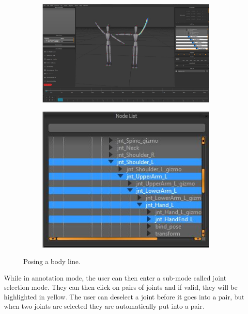 \begin{figure}[h!]
	\centering
        \begin{subfigure}[b!]{0.45\textwidth}
        	\centering
                \includegraphics[width=\linewidth]{img/ui3}
        \end{subfigure}
        \quad
        \begin{subfigure}[b!]{0.45\textwidth}
        	\centering
                \includegraphics[width=\linewidth]{img/ui4}
        \end{subfigure}%
        \caption{Posing a body line.}
	\label{fig:posingbl}
\end{figure}

While in annotation mode, the user can then enter a sub-mode called joint selection mode. They can then click on pairs of joints and if valid, they will be highlighted in yellow. The user can deselect a joint before it goes into a pair, but when two joints are selected they are automatically put into a pair.


